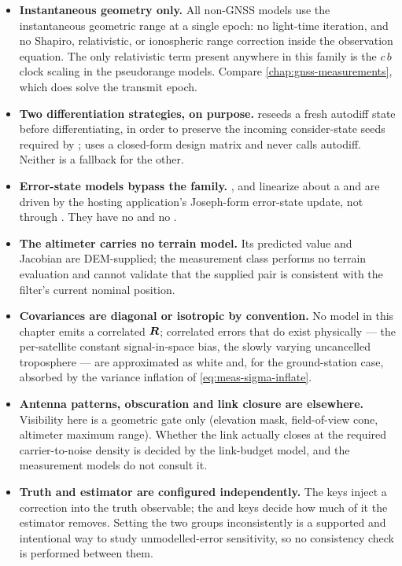 \begin{itemize}[leftmargin=1.4em]
  \item \textbf{Instantaneous geometry only.} All non-GNSS models use the
    instantaneous geometric range at a single epoch: no light-time iteration,
    and no Shapiro, relativistic, or ionospheric range correction inside the
    observation equation. The only relativistic term present anywhere in this
    family is the $c\,b$ clock scaling in the pseudorange models. Compare
    \cref{chap:gnss-measurements}, which does solve the transmit epoch.
  \item \textbf{Two differentiation strategies, on purpose.}
     reseeds a fresh autodiff state before
    differentiating, in order to preserve the incoming consider-state seeds
    required by ;  uses a
    closed-form design matrix and never calls autodiff. Neither is a fallback
    for the other.
  \item \textbf{Error-state models bypass the  family.}
    ,  and
     linearize about a  and
    are driven by the hosting application's Joseph-form error-state update, not
    through . They have no  and no
    .
  \item \textbf{The altimeter carries no terrain model.} Its predicted value
    and Jacobian are DEM-supplied; the measurement class performs no terrain
    evaluation and cannot validate that the supplied pair is consistent with
    the filter's current nominal position.
  \item \textbf{Covariances are diagonal or isotropic by convention.} No model
    in this chapter emits a correlated $\bm{R}$; correlated errors that do
    exist physically --- the per-satellite constant signal-in-space bias, the
    slowly varying uncancelled troposphere --- are approximated as white and,
    for the ground-station case, absorbed by the variance inflation of
    \cref{eq:meas-sigma-inflate}.
  \item \textbf{Antenna patterns, obscuration and link closure are elsewhere.}
    Visibility here is a geometric gate only (elevation mask, field-of-view
    cone, altimeter maximum range). Whether the link actually closes at the
    required carrier-to-noise density is decided by the link-budget model, and
    the measurement models do not consult it.
  \item \textbf{Truth and estimator are configured independently.} The
     keys inject a correction into the truth observable; the
     and  keys decide how much of it
    the estimator removes. Setting the two groups inconsistently is a supported
    and intentional way to study unmodelled-error sensitivity, so no
    consistency check is performed between them.
\end{itemize}
